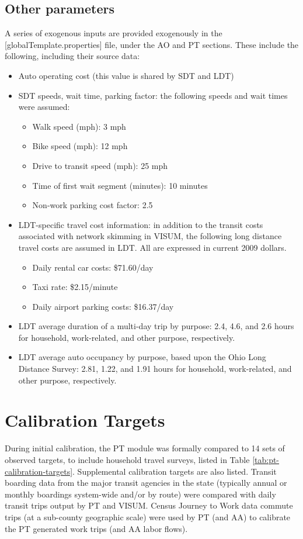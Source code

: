 \subsection{Other parameters}
A series of exogenous inputs are provided exogenously in the [globalTemplate.properties] file, under the AO and PT sections. These include the following, including their source data:
\begin{itemize}
\item Auto operating cost (this value is shared by SDT and LDT)
\item SDT speeds, wait time, parking factor: the following speeds and wait times were assumed:
\begin{itemize}
\item Walk speed (mph): 3 mph
\item Bike speed (mph): 12 mph
\item Drive to transit speed (mph): 25 mph
\item Time of first wait segment (minutes): 10 minutes
\item Non-work parking cost factor: 2.5
\end{itemize}
\item LDT-specific travel cost information: in addition to the transit costs associated with network skimming in VISUM, the following long distance travel costs are assumed in LDT. All are expressed in current 2009 dollars.
\begin{itemize}
\item Daily rental car costs: \$71.60/day
\item Taxi rate: \$2.15/minute
\item Daily airport parking costs: \$16.37/day
\end{itemize}
\item LDT average duration of a multi-day trip by purpose: 2.4, 4.6, and 2.6 hours for household, work-related, and other purpose, respectively.
\item LDT average auto occupancy by purpose, based upon the Ohio Long Distance Survey: 2.81, 1.22, and 1.91 hours for household, work-related, and other purpose, respectively.
\end{itemize}

\section{Calibration Targets}
During initial calibration, the PT module was formally compared to 14 sets of observed targets, to include household travel surveys, listed in Table \ref{tab:pt-calibration-targets}. Supplemental calibration targets are also listed. Transit boarding data from the major transit agencies in the state (typically annual or monthly boardings system-wide and/or by route) were compared with daily transit trips output by PT and VISUM. Census Journey to Work data commute trips (at a sub-county geographic scale) were used by PT (and AA) to calibrate the PT generated work trips (and AA labor flows).

